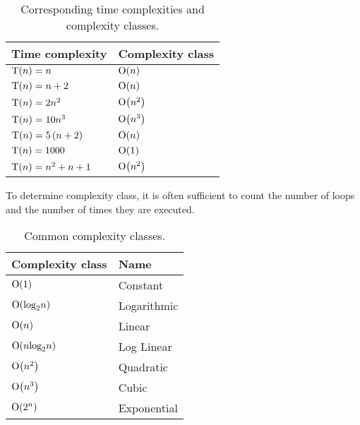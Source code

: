 \begin{table}[htp]
  \centering
  \caption*{Corresponding time complexities and complexity classes.}
  \begin{tabular}{ll}
    \toprule
    Time complexity & Complexity class \\
    \midrule
    \( \textup{T}\!\left( n \right) = n                      \) & \( \textup{O}\!\left( n \right)   \) \\
    \( \textup{T}\!\left( n \right) = n + 2                  \) & \( \textup{O}\!\left( n \right)   \) \\
    \( \textup{T}\!\left( n \right) = 2 n^2                  \) & \( \textup{O}\!\left( n^2 \right) \) \\
    \( \textup{T}\!\left( n \right) = 10 n^3                 \) & \( \textup{O}\!\left( n^3 \right) \) \\
    \( \textup{T}\!\left( n \right) = 5 \left( n + 2 \right) \) & \( \textup{O}\!\left( n \right)   \) \\
    \( \textup{T}\!\left( n \right) = 1000                   \) & \( \textup{O}\!\left( 1 \right)   \) \\
    \( \textup{T}\!\left( n \right) = n^2 + n + 1            \) & \( \textup{O}\!\left( n^2 \right) \) \\
    \bottomrule
  \end{tabular}
\end{table}

To determine complexity class, it is often sufficient to count the number of loops and the number of times they are executed.

\begin{table}
  \centering
  \caption*{Common complexity classes.}
  \begin{tabular}{ll}
    \toprule
    Complexity class & Name \\
    \midrule
    \( \textup{O}\!\left( 1 \right)                  \) & Constant    \\
    \( \textup{O}\!\left( \textup{log}_2 n \right)   \) & Logarithmic \\
    \( \textup{O}\!\left( n \right)                  \) & Linear      \\
    \( \textup{O}\!\left( n \textup{log}_2 n \right) \) & Log Linear  \\
    \( \textup{O}\!\left( n^2 \right)                \) & Quadratic   \\
    \( \textup{O}\!\left( n^3 \right)                \) & Cubic       \\
    \( \textup{O}\!\left( 2^n \right)                \) & Exponential \\
    \bottomrule
  \end{tabular}
\end{table}

